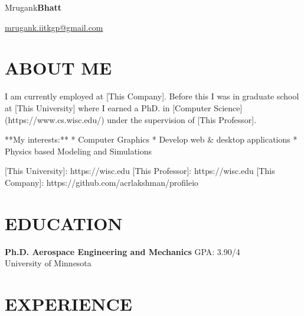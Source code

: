 \documentclass{res}
\begin{document}
	\hspace*{-0.05\textwidth}
	\begin{minipage}[t]{0.6\textwidth}
	\begin{flushleft}
	\vspace*{\fill}
	{\fontsize{45}{45}\selectfont Mrugank\textbf{Bhatt}}
	\end{flushleft}
	\end{minipage}
	\begin{minipage}[t]{0.44\textwidth}
	\begin{flushright}
	\href{mailto:mrugank.iitkgp@gmail.com}{mrugank.iitkgp@gmail.com} \\ 
	\end{flushright}
	\end{minipage}

	\begin{resume}
	
	
	\section{\MakeUppercase{About me}} \vskip 0.15in
	I am currently employed at [This Company]. Before this I was in graduate school at [This University] where I earned a PhD. in [Computer Science](https://www.cs.wisc.edu/) under the supervision of [This Professor].

**My interests:**
* Computer Graphics
* Develop web \& desktop applications
* Physics based Modeling and Simulations

[This University]: https://wisc.edu
[This Professor]: https://wisc.edu
[This Company]: https://github.com/acrlakshman/profileio
	
	
	
	\section{\MakeUppercase{Education}} \vskip 0.15in
	
	{\bf Ph.D. Aerospace Engineering and Mechanics} \hfill GPA: 3.90/4 \\
	{University of Minnesota \hfill } 
	
	
	
	\section{\MakeUppercase{Experience}} \vskip 0.15in
	

\end{resume}
\end{document}
